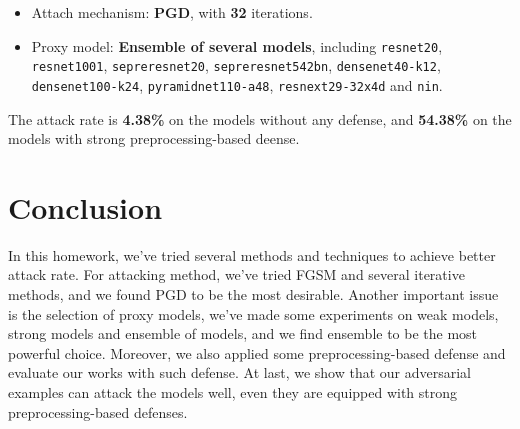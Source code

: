 \documentclass{article}
\begin{document}
\begin{itemize}
  \item Attach mechanism: \textbf{PGD}, with \textbf{32} iterations.
  \item Proxy model: \textbf{Ensemble of several models}, including \texttt{resnet20}, \texttt{resnet1001}, \texttt{sepreresnet20}, \texttt{sepreresnet542bn}, \texttt{densenet40-k12}, \texttt{densenet100-k24}, \texttt{pyramidnet110-a48}, \texttt{resnext29-32x4d} and \texttt{nin}.
\end{itemize}

The attack rate is \textbf{4.38\%} on the models without any defense, and \textbf{54.38\%} on the models with strong preprocessing-based deense.

\section{Conclusion}
In this homework, we've tried several methods and techniques to achieve better attack rate. For attacking method, we've tried FGSM and several iterative methods, and we found PGD to be the most desirable. Another important issue is the selection of proxy models, we've made some experiments on weak models, strong models and ensemble of models, and we find ensemble to be the most powerful choice. Moreover, we also applied some preprocessing-based defense and evaluate our works with such defense. At last, we show that our adversarial examples can attack the models well, even they are equipped with strong preprocessing-based defenses.



\end{document}
